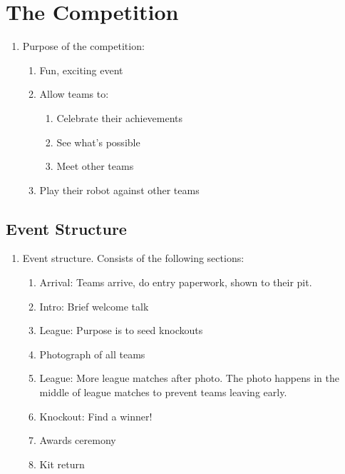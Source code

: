 \section{The Competition}

\begin{enumerate}
\item Purpose of the competition:
  \begin{enumerate}
  \item Fun, exciting event
  \item Allow teams to:
    \begin{enumerate}
    \item Celebrate their achievements
    \item See what's possible
    \item Meet other teams
    \end{enumerate}
  \item Play their robot against other teams
  \end{enumerate}

\end{enumerate}

\subsection{Event Structure}
\begin{enumerate}
\item Event structure.  Consists of the following sections:
  \begin{enumerate}
  \item Arrival: Teams arrive, do entry paperwork, shown to their pit.
  \item Intro: Brief welcome talk
  \item League: Purpose is to seed knockouts
  \item Photograph of all teams
  \item League: More league matches after photo. The photo happens in the middle of league matches to prevent teams leaving early.
  \item Knockout: Find a winner!
  \item Awards ceremony
  \item Kit return
  \end{enumerate}
\end{enumerate}

